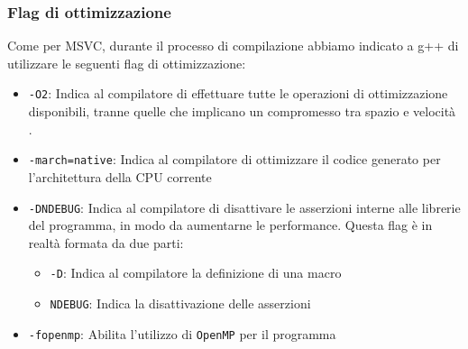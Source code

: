 \subsubsection{Flag di ottimizzazione}
Come per MSVC, durante il processo di compilazione abbiamo indicato a g++ di utilizzare le seguenti flag di ottimizzazione:
\begin{itemize}
	\item \texttt{-O2}: Indica al compilatore di effettuare tutte le operazioni di ottimizzazione disponibili, tranne quelle che implicano un compromesso tra spazio e velocità \cite{gcc_O2}.
	\item \texttt{-march=native}: Indica al compilatore di ottimizzare il codice generato per l'architettura della CPU corrente \cite{gcc_aarch64_march_mcpu}
	\item \texttt{-DNDEBUG}: Indica al compilatore di disattivare le asserzioni interne alle librerie del programma, in modo da aumentarne le performance. Questa flag è in realtà formata da due parti:
	\begin{itemize}
		\item \texttt{-D}: Indica al compilatore la definizione di una macro \cite{gcc_preprocessor_D}
		\item \texttt{NDEBUG}: Indica la disattivazione delle asserzioni \cite{cpp_assert}
	\end{itemize}
	\item \texttt{-fopenmp}: Abilita l'utilizzo di \texttt{OpenMP} per il programma
\end{itemize}







